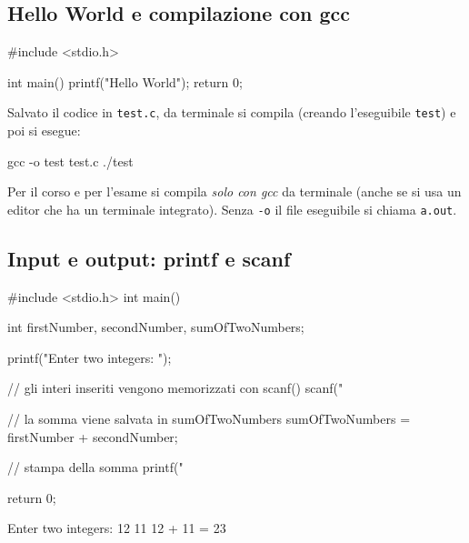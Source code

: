 \documentclass[11pt,a4paper]{article}
\begin{document}
\subsection{Hello World e compilazione con gcc}

\begin{codice}
#include <stdio.h>

int main() {
    printf("Hello World\n");
    return 0;
}
\end{codice}

Salvato il codice in \texttt{test.c}, da terminale si compila (creando l'eseguibile \texttt{test}) e poi si esegue:
\begin{comando}
gcc -o test test.c
./test
\end{comando}

\begin{osservazione}
Per il corso e per l'esame si compila \emph{solo con gcc} da terminale (anche
se si usa un editor che ha un terminale integrato). Senza \lstinline|-o| il
file eseguibile si chiama \texttt{a.out}.
\end{osservazione}

\subsection{Input e output: printf e scanf}

\begin{esempio}
\begin{codice}
#include <stdio.h>
int main() {
    int firstNumber, secondNumber, sumOfTwoNumbers;

    printf("Enter two integers: ");

    // gli interi inseriti vengono memorizzati con scanf()
    scanf("%

    // la somma viene salvata in sumOfTwoNumbers
    sumOfTwoNumbers = firstNumber + secondNumber;

    // stampa della somma
    printf("%

    return 0;
}
\end{codice}
\begin{risultato}
Enter two integers: 12
11
12 + 11 = 23
\end{risultato}
\end{esempio}
\end{document}
